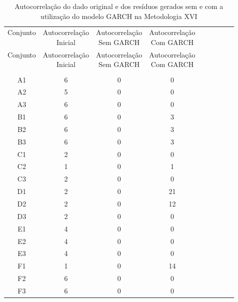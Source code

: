 \begin{center}
\begin{longtable}{ccccc|cccc}
\toprule
\rowcolor{white}
\caption[Metodologia XVI: evolução da autocorrelação]{Autocorrelação do dado
original e dos resíduos gerados sem e com a utilização do modelo GARCH na
Metodologia XVI} \label{tab:EvolucaoAutocorrelacaoMet16}\\
\midrule
Conjunto & \specialcell{Autocorrelação\\Inicial} & \specialcell{Autocorrelação\\Sem
GARCH} & \specialcell{Autocorrelação\\Com GARCH} \\
\midrule
\endfirsthead 
\midrule
\rowcolor{white}
Conjunto & \specialcell{Autocorrelação\\Inicial} & \specialcell{Autocorrelação\\Sem
GARCH} & \specialcell{Autocorrelação\\Com GARCH} \\
\toprule
\endhead
\midrule \\ %
\endfoot
\bottomrule 
\endlastfoot
A1    & 6     & 0     & 0 \\
A2    & 5     & 0     & 0 \\
A3    & 6     & 0     & 0 \\
B1    & 6     & 0     & 3 \\
B2    & 6     & 0     & 3 \\
B3    & 6     & 0     & 3 \\
C1    & 2     & 0     & 0 \\
C2    & 1     & 0     & 1 \\
C3    & 2     & 0     & 0 \\
D1    & 2     & 0     & 21 \\
D2    & 2     & 0     & 12 \\
D3    & 2     & 0     & 0 \\
E1    & 4     & 0     & 0 \\
E2    & 4     & 0     & 0 \\
E3    & 4     & 0     & 0 \\
F1    & 1     & 0     & 14 \\
F2    & 6     & 0     & 0 \\
F3    & 6     & 0     & 0 \\

\end{longtable}
\end{center}
